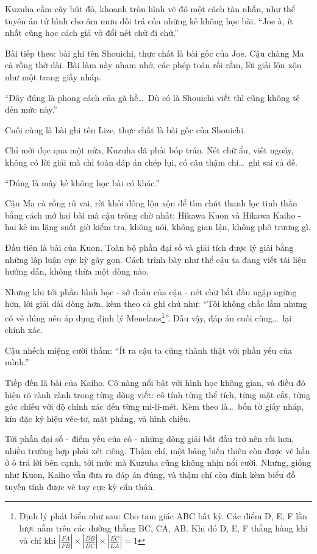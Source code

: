 \documentclass[../main.tex]{subfiles}
\begin{document}
Kuzuha cầm cây bút đỏ, khoanh tròn hình vẽ đó một cách tàn nhẫn, như thể tuyên án tử hình cho âm mưu dối trá của những kẻ không học bài. ``Joe à, ít nhất cũng học cách giả vờ đổi nét chữ đi chứ.''

Bài tiếp theo: bài ghi tên Shouichi, thực chất là bài gốc của Joe. Cậu chàng Ma cà rồng thở dài. Bài làm này nham nhở, các phép toán rối rắm, lời giải lộn xộn như một trang giấy nháp.

``Đây đúng là phong cách của gã hề\dots\ Dù có là Shouichi viết thì cũng không tệ đến mức này.''

Cuối cùng là bài ghi tên Lize, thực chất là bài gốc của Shouichi.

Chỉ mới đọc qua một nửa, Kuzuha đã phải bóp trán. Nét chữ ẩu, viết ngoáy, không có lời giải mà chỉ toàn đáp án chép lụi, có câu thậm chí\dots\ ghi sai cả đề.

``Đúng là mấy kẻ không học bài có khác.''

Cậu Ma cà rồng rũ vai, rời khỏi đống lộn xộn để tìm chút thanh lọc tinh thần bằng cách mở hai bài mà cậu trông chờ nhất: Hikawa Kuon và Hikawa Kaiho - hai kẻ im lặng suốt giờ kiểm tra, không nói, không gian lận, không phô trương gì.

Đầu tiên là bài của Kuon. Toàn bộ phần đại số và giải tích được lý giải bằng những lập luận cực kỳ gãy gọn. Cách trình bày như thể cậu ta đang viết tài liệu hướng dẫn, không thừa một dòng nào.

Nhưng khi tới phần hình học - sở đoản của cậu - nét chữ bắt đầu ngập ngừng hơn, lời giải dài dòng hơn, kèm theo cả ghi chú như: ``Tôi không chắc lắm nhưng có vẻ đúng nếu áp dụng định lý Menelaus\footnote{Định lý phát biểu như sau: Cho tam giác ABC bất kỳ. Các điểm D, E, F lần lượt nằm trên các đường thẳng BC, CA, AB. Khi đó D, E, F thẳng hàng khi và chỉ khi $\left|\frac{\overline{FA}}{\overline{FB}}\right| \times \left|\frac{\overline{DB}}{\overline{DC}}\right| \times \left|\frac{\overline{EC}}{\overline{EA}}\right| = 1$}''. Dẫu vậy, đáp án cuối cùng\dots\ lại chính xác.

Cậu nhếch miệng cười thầm: ``Ít ra cậu ta cũng thành thật với phần yếu của mình.''

Tiếp đến là bài của Kaiho. Cô nàng nổi bật với hình học không gian, và điều đó hiện rõ rành rành trong từng dòng viết: cô tính từng thể tích, từng mặt cắt, từng góc chiếu với độ chính xác đến từng mi-li-mét. Kèm theo là\dots\ bốn tờ giấy nháp, kín đặc ký hiệu véc-tơ, mặt phẳng, và hình chiếu.

Tới phần đại số - điểm yếu của cô - những dòng giải bắt đầu trở nên rối hơn, nhiều trường hợp phải xét riêng. Thậm chí, một bảng biến thiên còn được vẽ hẳn ở ô trả lời bên cạnh, tới mức mà Kuzuha cũng không nhịn nổi cười. Nhưng, giống như Kuon, Kaiho vẫn đưa ra đáp án đúng, và thậm chí còn đính kèm biểu đồ tuyến tính được vẽ tay cực kỳ cẩn thận.
\end{document}
